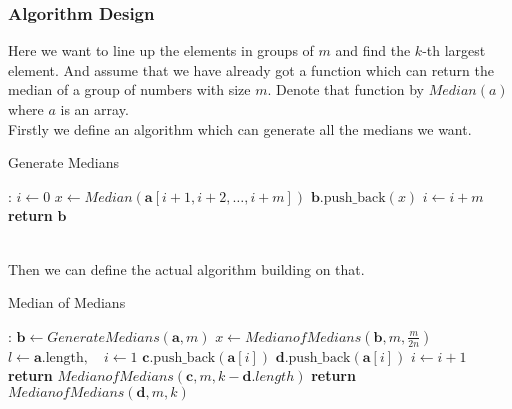 \documentclass[12pt,letterpaper]{article}
\begin{document}
\subsubsection{Algorithm Design}
Here we want to line up the elements in groups of $m$ and find the $k$-th largest element. And assume that we have already got a function which can return the median of a group of numbers with size $m$. Denote that function by $Median(a)$ where $a$ is an array.\\
Firstly we define an algorithm which can generate all the medians we want.
\begin{algorithm}
    \caption{Generate Medians}\label{alg:gm}
    \begin{algorithmic}[1]
    :
    \State $i\gets 0$
    \State $x\gets Median(\boldsymbol{a}[i+1,i+2,\dots,i+m])$
    \State $\boldsymbol{b}\text{.push\_back}(x)$
    \State $i\gets i+m$
    \EndWhile
    \State \textbf{return} $\boldsymbol{b}$
    \EndProcedure
    \end{algorithmic}
\end{algorithm}\\
Then we can define the actual algorithm building on that.
\begin{algorithm}
    \caption{Median of Medians}\label{alg:mofm}
    \begin{algorithmic}[1]
    :
    \EndIf
    \State $\boldsymbol{b}\gets Generate Medians(\boldsymbol{a},m)$
    \State $x\gets MedianofMedians(\boldsymbol{b},m,\frac{m}{2n})$
    \State $l\gets \boldsymbol{a}\text{.length}, \quad i\gets 1$
     $\boldsymbol{c}.\text{push\_back}(\boldsymbol{a}[i])$
    \EndIf
     $\boldsymbol{d}.\text{push\_back}(\boldsymbol{a}[i])$
    \EndIf 
    \State $i\gets i+1$
    \EndWhile
     \textbf{return} $MedianofMedians(\boldsymbol{c},m,k-\boldsymbol{d}.length)$
    \EndIf
     \textbf{return} $MedianofMedians(\boldsymbol{d},m,k)$
    \EndIf
    \EndProcedure
    \end{algorithmic}
\end{algorithm}
\newpage
\end{document}
